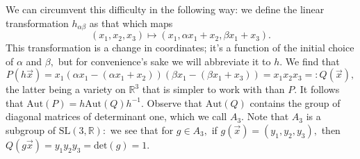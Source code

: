 \documentclass[12pt, letterpaper, oneside]{book}
\newcommand{\ga}{\ensuremath{\alpha}}
\newcommand{\gb}{\ensuremath{\beta}}
\newcommand{\R}{\mathbb{R}}
\theoremstyle{plain}
\theoremstyle{definition}
\theoremstyle{remark}
\begin{document}
We can circumvent this difficulty in the following way: we define the linear transformation $h_{\ga \gb}$ as that which maps
\[
(x_1,x_2,x_3) {\mapsto} (x_1, \ga x_1 + x_2, \gb x_1 + x_3).
\]
This transformation is a change in coordinates; it's a function of the initial choice of $\ga$ and $\gb,$ but for convenience's sake we will abbreviate it to $h.$ We find that 
\[
P(h\vec{x}) = x_1(\ga x_1 - (\ga x_1 + x_2))(\gb x_1 - (\gb x_1 + x_3)) = x_1x_2x_3 =: Q(\vec{x}),
\]
the latter being a variety on $\R^3$ that is simpler to work with than $P.$ It follows that $\mbox{Aut}(P) = h \mbox{Aut}(Q) h^{-1}.$ Observe that $\mbox{Aut}(Q)$ contains the group of diagonal matrices of determinant one, which we call $A_3.$ Note that $A_3$ is a subgroup of $\mbox{SL}(3,\R):$ we see that for $g \in A_3,$ if $g(\vec{x}) = (y_1,y_2,y_3),$ then  $Q(g\vec{x}) = y_1y_2y_3 = \mbox{det}(g) = 1.$
\end{document}
